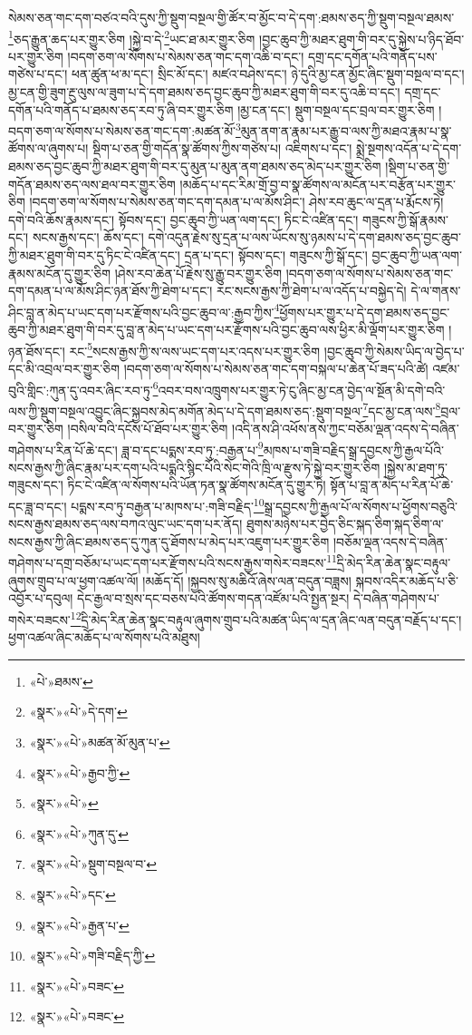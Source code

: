 སེམས་ཅན་གང་དག་བཙའ་བའི་དུས་ཀྱི་སྡུག་བསྔལ་གྱི་ཚོར་བ་མྱོང་བ་དེ་དག་:ཐམས་ཅད་ཀྱི་སྡུག་བསྔལ་ཐམས་\footnote{«པེ་»ཐམས་}ཅད་རྒྱུན་ཆད་པར་གྱུར་ཅིག །སྐྱེ་བ་དེ་\footnote{«སྣར་»«པེ་»དེ་དག་}ཡང་ཐ་མར་གྱུར་ཅིག །བྱང་ཆུབ་ཀྱི་མཐར་ཐུག་གི་བར་དུ་སྐྱེས་པ་ཉིད་ཐོབ་པར་གྱུར་ཅིག །བདག་ཅག་ལ་སོགས་པ་སེམས་ཅན་གང་དག་འཆི་བ་དང་། དགྲ་དང་དགོན་པའི་གནོད་པས་གཙེས་པ་དང་། ཕན་ཚུན་ཕ་མ་དང་། སྲིང་མོ་དང་། མཛའ་བཤེས་དང་། ཉེ་དུའི་མྱ་ངན་མྱོང་ཞིང་སྡུག་བསྔལ་བ་དང་། མྱ་ངན་གྱི་ཟུག་རྔུ་ལུས་ལ་ཟུག་པ་དེ་དག་ཐམས་ཅད་བྱང་ཆུབ་ཀྱི་མཐར་ཐུག་གི་བར་དུ་འཆི་བ་དང་། དགྲ་དང་དགོན་པའི་གནོད་པ་ཐམས་ཅད་རབ་ཏུ་ཞི་བར་གྱུར་ཅིག །མྱ་ངན་དང་། སྡུག་བསྔལ་དང་བྲལ་བར་གྱུར་ཅིག །བདག་ཅག་ལ་སོགས་པ་སེམས་ཅན་གང་དག་:མཚན་མོ་\footnote{«སྣར་»«པེ་»མཚན་མོ་མུན་པ་}མུན་ནག་ན་རྣམ་པར་རྒྱུ་བ་ལས་ཀྱི་མཐའ་རྣམ་པ་སྣ་ཚོགས་ལ་ཞུགས་པ། སྡིག་པ་ཅན་གྱི་གདོན་སྣ་ཚོགས་ཀྱིས་གཙེས་པ། འཇིགས་པ་དང་། སྨྲེ་སྔགས་འདོན་པ་དེ་དག་ཐམས་ཅད་བྱང་ཆུབ་ཀྱི་མཐར་ཐུག་གི་བར་དུ་མུན་པ་མུན་ནག་ཐམས་ཅད་མེད་པར་གྱུར་ཅིག །སྡིག་པ་ཅན་གྱི་གདོན་ཐམས་ཅད་ལས་ཐལ་བར་གྱུར་ཅིག །མཆོད་པ་དང་རིམ་གྲོ་བྱ་བ་སྣ་ཚོགས་ལ་མངོན་པར་བརྩོན་པར་གྱུར་ཅིག །བདག་ཅག་ལ་སོགས་པ་སེམས་ཅན་གང་དག་དམན་པ་ལ་མོས་ཤིང་། ཤེས་རབ་ཆུང་ལ་དྲན་པ་རྨོངས་ཏེ། དགེ་བའི་ཆོས་རྣམས་དང་། སྟོབས་དང་། བྱང་ཆུབ་ཀྱི་ཡན་ལག་དང་། ཏིང་ངེ་འཛིན་དང་། གཟུངས་ཀྱི་སྒོ་རྣམས་དང་། སངས་རྒྱས་དང་། ཆོས་དང་། དགེ་འདུན་རྗེས་སུ་དྲན་པ་ལས་ཡོངས་སུ་ཉམས་པ་དེ་དག་ཐམས་ཅད་བྱང་ཆུབ་ཀྱི་མཐར་ཐུག་གི་བར་དུ་ཏིང་ངེ་འཛིན་དང་། དྲན་པ་དང་། སྟོབས་དང་། གཟུངས་ཀྱི་སྒོ་དང་། བྱང་ཆུབ་ཀྱི་ཡན་ལག་རྣམས་མངོན་དུ་གྱུར་ཅིག །ཤེས་རབ་ཆེན་པོ་རྗེས་སུ་རྒྱུ་བར་གྱུར་ཅིག །བདག་ཅག་ལ་སོགས་པ་སེམས་ཅན་གང་དག་དམན་པ་ལ་མོས་ཤིང་ཉན་ཐོས་ཀྱི་ཐེག་པ་དང་། རང་སངས་རྒྱས་ཀྱི་ཐེག་པ་ལ་འདོད་པ་བསྐྱེད་དེ། དེ་ལ་གནས་ཤིང་བླ་ན་མེད་པ་ཡང་དག་པར་རྫོགས་པའི་བྱང་ཆུབ་ལ་:རྒྱབ་ཀྱིས་\footnote{«སྣར་»«པེ་»རྒྱབ་ཀྱི་}ཕྱོགས་པར་གྱུར་པ་དེ་དག་ཐམས་ཅད་བྱང་ཆུབ་ཀྱི་མཐར་ཐུག་གི་བར་དུ་བླ་ན་མེད་པ་ཡང་དག་པར་རྫོགས་པའི་བྱང་ཆུབ་ལས་ཕྱིར་མི་ལྡོག་པར་གྱུར་ཅིག །ཉན་ཐོས་དང་། རང་\footnote{«སྣར་»«པེ་»}སངས་རྒྱས་ཀྱི་ས་ལས་ཡང་དག་པར་འདས་པར་གྱུར་ཅིག །བྱང་ཆུབ་ཀྱི་སེམས་ཡིད་ལ་བྱེད་པ་དང་མི་འབྲལ་བར་གྱུར་ཅིག །བདག་ཅག་ལ་སོགས་པ་སེམས་ཅན་གང་དག་བསྐལ་པ་ཆེན་པོ་ཟད་པའི་ཚེ། འཛམ་བུའི་གླིང་:ཀུན་དུ་འབར་ཞིང་རབ་ཏུ་\footnote{«སྣར་»«པེ་»ཀུན་དུ་}འབར་བས་འཁྲུགས་པར་གྱུར་ཏེ་ངུ་ཞིང་མྱ་ངན་བྱེད་ལ་སྔོན་མི་དགེ་བའི་ལས་ཀྱི་སྡུག་བསྔལ་འབྱུང་ཞིང་སྐྱབས་མེད་མགོན་མེད་པ་དེ་དག་ཐམས་ཅད་:སྡུག་བསྔལ་\footnote{«སྣར་»«པེ་»སྡུག་བསྔལ་བ་}དང་མྱ་ངན་ལས་\footnote{«སྣར་»«པེ་»དང་}བྲལ་བར་གྱུར་ཅིག །བསིལ་བའི་དངོས་པོ་ཐོབ་པར་གྱུར་ཅིག །འདི་ནས་ཤི་འཕོས་ནས་ཀྱང་བཅོམ་ལྡན་འདས་དེ་བཞིན་གཤེགས་པ་རིན་པོ་ཆེ་དང་། ཟླ་བ་དང་པདྨས་རབ་ཏུ་:བརྒྱན་པ་\footnote{«སྣར་»«པེ་»རྒྱན་པ་}མཁས་པ་གཟི་བརྗིད་སྒྲ་དབྱངས་ཀྱི་རྒྱལ་པོའི་སངས་རྒྱས་ཀྱི་ཞིང་རྣམ་པར་དག་པའི་པདྨའི་སྙིང་པོའི་སེང་གེའི་ཁྲི་ལ་རྫུས་ཏེ་སྐྱེ་བར་གྱུར་ཅིག །སྐྱེས་མ་ཐག་ཏུ་གཟུངས་དང་། ཏིང་ངེ་འཛིན་ལ་སོགས་པའི་ཡོན་ཏན་སྣ་ཚོགས་མངོན་དུ་གྱུར་ཏེ། སྟོན་པ་བླ་ན་མེད་པ་རིན་པོ་ཆེ་དང་ཟླ་བ་དང་། པདྨས་རབ་ཏུ་བརྒྱན་པ་མཁས་པ་:གཟི་བརྗིད་\footnote{«སྣར་»«པེ་»གཟི་བརྗིད་ཀྱི་}སྒྲ་དབྱངས་ཀྱི་རྒྱལ་པོ་ལ་སོགས་པ་ཕྱོགས་བཅུའི་སངས་རྒྱས་ཐམས་ཅད་ལས་བཀའ་ལུང་ཡང་དག་པར་ནོད། ཐུགས་མཉེས་པར་བྱེད་ཅིང་སྐད་ཅིག་སྐད་ཅིག་ལ་སངས་རྒྱས་ཀྱི་ཞིང་ཐམས་ཅད་དུ་ཀུན་དུ་ཐོགས་པ་མེད་པར་འཇུག་པར་གྱུར་ཅིག །བཅོམ་ལྡན་འདས་དེ་བཞིན་གཤེགས་པ་དགྲ་བཅོམ་པ་ཡང་དག་པར་རྫོགས་པའི་སངས་རྒྱས་གསེར་བཟངས་\footnote{«སྣར་»«པེ་»བཟང་}དྲི་མེད་རིན་ཆེན་སྣང་བརྟུལ་ཞུགས་གྲུབ་པ་ལ་ཕྱག་འཚལ་ལོ། །མཆོད་དོ། །སྐྱབས་སུ་མཆིའོ་ཞེས་ལན་བདུན་བཟླས། སྐབས་འདིར་མཆོད་པ་ཅི་འབྱོར་པ་དབུལ། དེང་རྒྱལ་བ་སྲས་དང་བཅས་པའི་ཚོགས་གདན་འཛོམ་པའི་སྤྱན་སྔར། དེ་བཞིན་གཤེགས་པ་གསེར་བཟངས་\footnote{«སྣར་»«པེ་»བཟང་}དྲི་མེད་རིན་ཆེན་སྣང་བརྟུལ་ཞུགས་གྲུབ་པའི་མཚན་ཡིད་ལ་དྲན་ཞིང་ལན་བདུན་བརྗོད་པ་དང་། ཕྱག་འཚལ་ཞིང་མཆོད་པ་ལ་སོགས་པའི་མཐུས། 